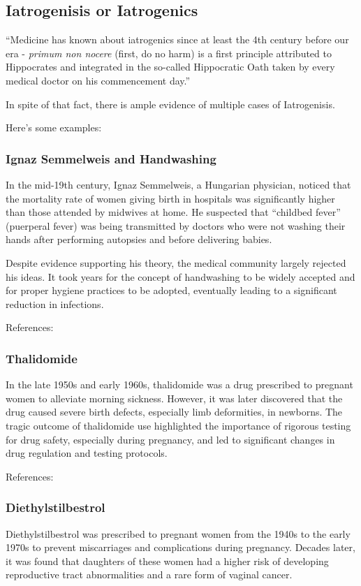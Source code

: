 \subsection{Iatrogenisis or Iatrogenics}

``Medicine has known about iatrogenics since at least the 4th century before our era - \emph{primum non nocere} (first, do no harm) is a first principle attributed to Hippocrates and integrated in the so-called Hippocratic Oath taken by every medical doctor on his commencement day.''\cite{Taleb2012}

In spite of that fact, there is ample evidence of multiple cases of Iatrogenisis. \cite{VarleyVarma2021}

Here's some examples:

\subsubsection{Ignaz Semmelweis and Handwashing}

In the mid-19th century, Ignaz Semmelweis, a Hungarian physician, noticed that the mortality rate of women giving birth in hospitals was significantly higher than those attended by midwives at home. He suspected that  ``childbed fever'' (puerperal fever) was being transmitted by doctors who were not washing their hands after performing autopsies and before delivering babies.

Despite evidence supporting his theory, the medical community largely rejected his ideas. It took years for the concept of handwashing to be widely accepted and for proper hygiene practices to be adopted, eventually leading to a significant reduction in infections.

References: \cite{Semmelweis2006}

\subsubsection{Thalidomide}
In the late 1950s and early 1960s, thalidomide was a drug prescribed to pregnant women to alleviate morning sickness. However, it was later discovered that the drug caused severe birth defects, especially
limb deformities, in newborns. The tragic outcome of thalidomide use highlighted the importance of rigorous testing for drug safety, especially during pregnancy, and led to significant changes in drug
regulation and testing protocols.

References: \cite{WGMcbride}

\subsubsection{Diethylstilbestrol}
Diethylstilbestrol was prescribed to pregnant women from the 1940s to the early 1970s to prevent miscarriages and complications during pregnancy. Decades later, it was found that daughters of these women
had a higher risk of developing reproductive tract abnormalities and a rare form of vaginal cancer.

